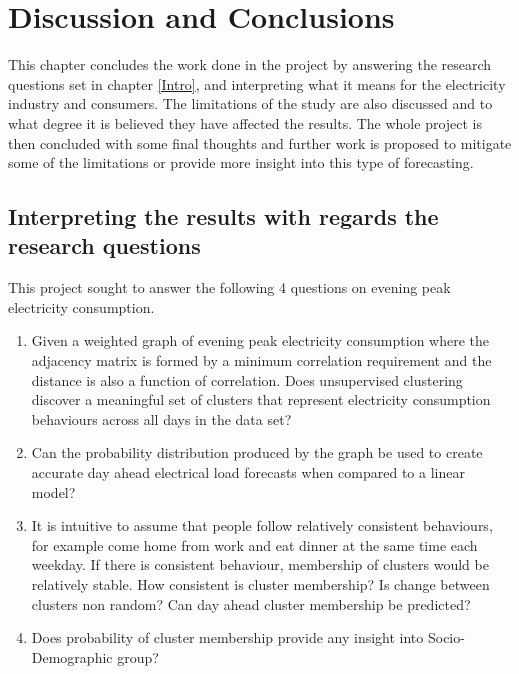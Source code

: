 \chapter{Discussion and Conclusions}
\label{conclusions}

This chapter concludes the work done in the project by answering the research questions set in chapter \ref{Intro}, and interpreting  what it means for the electricity industry and consumers. The limitations of the study are also discussed and to what degree it is believed they have affected the results. The whole project is then concluded with some final thoughts and further work is proposed to mitigate some of the limitations or provide more insight into this type of forecasting.

\section{Interpreting the results with regards the research questions}

This project sought to answer the following 4 questions on evening peak electricity consumption.
\begin{enumerate}
\itemsep0em 
    \item Given a weighted graph of evening peak electricity consumption where the adjacency matrix is formed by a minimum correlation requirement and the distance is also a function of correlation. Does unsupervised clustering discover a meaningful set of clusters that represent electricity consumption behaviours across all days in the data set?
    
    \item Can the probability distribution produced by the graph be used to create accurate day ahead electrical load forecasts when compared to a linear model?
    
    \item It is intuitive to assume that people follow relatively consistent behaviours, for example come home from work and eat dinner at the same time each weekday. If there is consistent behaviour, membership of clusters would be relatively stable. How consistent is cluster membership? Is change between clusters non random? Can day ahead cluster membership be predicted?

    \item Does probability of cluster membership provide any insight into Socio-Demographic group?
\end{enumerate}

